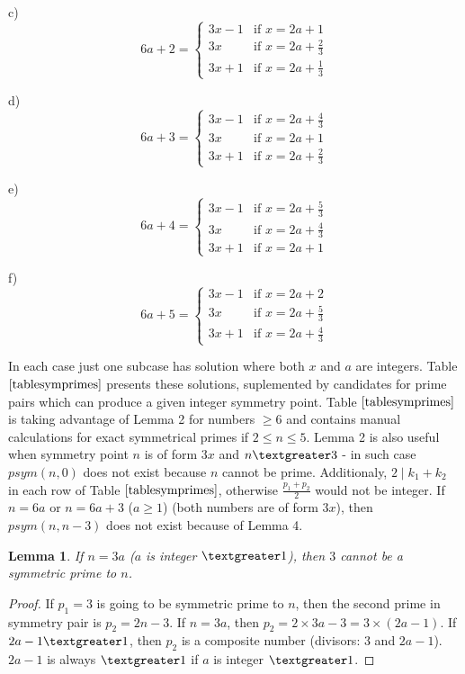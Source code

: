 \documentclass[10pt,twocolumn]{article}
\newtheorem{lemma}[theorem]{Lemma}
\begin{document}
c)
$$
6a + 2 = \left\{ \begin{array}{ll}
3x - 1 & \textrm{if $x = 2a + 1$}\\
3x & \textrm{if $x = 2a + \frac{2}{3}$}\\
3x + 1 & \textrm{if $x = 2a + \frac{1}{3}$}
\end{array} \right.
$$

d)
$$
6a + 3 = \left\{ \begin{array}{ll}
3x - 1 & \textrm{if $x = 2a + \frac{4}{3}$}\\
3x & \textrm{if $x = 2a + 1$}\\
3x + 1 & \textrm{if $x = 2a + \frac{2}{3}$}
\end{array} \right.
$$

e)
$$
6a + 4 = \left\{ \begin{array}{ll}
3x - 1 & \textrm{if $x = 2a + \frac{5}{3}$}\\
3x & \textrm{if $x = 2a + \frac{4}{3}$}\\
3x + 1 & \textrm{if $x = 2a + 1$}
\end{array} \right.
$$

f)
$$
6a + 5 = \left\{ \begin{array}{ll}
3x - 1 & \textrm{if $x = 2a + 2$}\\
3x & \textrm{if $x = 2a + \frac{5}{3}$}\\
3x + 1 & \textrm{if $x = 2a + \frac{4}{3}$}
\end{array} \right.
$$

In each case just one subcase has solution where both $x$ and $a$ are integers. Table $\ref{tablesymprimes}$ presents these solutions, suplemented by candidates for prime pairs which can produce a given integer symmetry point. Table $\ref{tablesymprimes}$ is taking advantage of Lemma 2 for numbers $\geq 6$ and contains manual calculations for exact symmetrical primes if $2 \leq n \leq 5$. Lemma 2 is also useful when symmetry point $n$ is of form $3x$ and $n \textgreater 3$ - in such case $psym(n,0)$ does not exist because $n$ cannot be prime. Additionaly, $2 \mid k_1 + k_2$ in each row of Table $\ref{tablesymprimes}$, otherwise $\frac{p_1 + p_2}{2}$ would not be integer. If $n=6a$ or $n=6a+3$ ($a \geq 1$) (both numbers are of form $3x$), then $psym(n, n-3)$ does not exist because of Lemma 4.

\begin{lemma}
If $n = 3a$ ($a$ is integer $\textgreater 1$), then $3$ cannot be a symmetric prime to $n$.
\end{lemma}
\begin{proof}
If $p_1 = 3$ is going to be symmetric prime to $n$, then the second prime in symmetry pair is $p_2 = 2n - 3$. If $n = 3a$, then $p_2 = 2 \times 3a - 3 = 3 \times (2a - 1)$. If $2a - 1 \textgreater 1$, then $p_2$ is a composite number (divisors: $3$ and $2a - 1$). $2a - 1$ is always $\textgreater 1$ if $a$ is integer $\textgreater 1$.
\end{proof}
\end{document}

